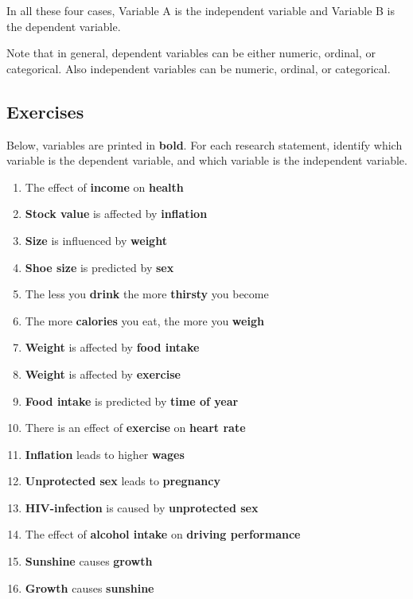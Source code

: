 \documentclass[]{report}\usepackage[]{graphicx}\usepackage[]{color}
\begin{document}
In all these four cases, Variable A is the independent variable and Variable B is the dependent variable.

Note that in general, dependent variables can be either numeric, ordinal, or categorical. Also independent variables can be numeric, ordinal, or categorical. 

\subsection{Exercises}

Below, variables are printed in \textbf{bold}. For each research statement, identify which variable is the dependent variable, and which variable is the independent variable.

\begin{enumerate}

\item The effect of \textbf{income} on \textbf{health}
\item \textbf{Stock value} is affected by \textbf{inflation}
\item \textbf{Size} is influenced by \textbf{weight}
\item \textbf{Shoe size} is predicted by \textbf{sex}
\item The less you \textbf{drink} the more \textbf{thirsty} you become 
\item The more \textbf{calories} you eat, the more you \textbf{weigh}
\item \textbf{Weight} is affected by \textbf{food intake} 
\item \textbf{Weight} is affected by \textbf{exercise} 
\item \textbf{Food intake} is predicted by \textbf{time of year}
\item There is an effect of \textbf{exercise} on \textbf{heart rate} 
\item \textbf{Inflation} leads to higher \textbf{wages} 
\item \textbf{Unprotected sex} leads to \textbf{pregnancy}
\item \textbf{HIV-infection} is caused by \textbf{unprotected sex}
\item The effect of \textbf{alcohol intake} on \textbf{driving performance}
\item \textbf{Sunshine} causes \textbf{growth}
\item \textbf{Growth} causes \textbf{sunshine}

\end{enumerate}
\end{document}
